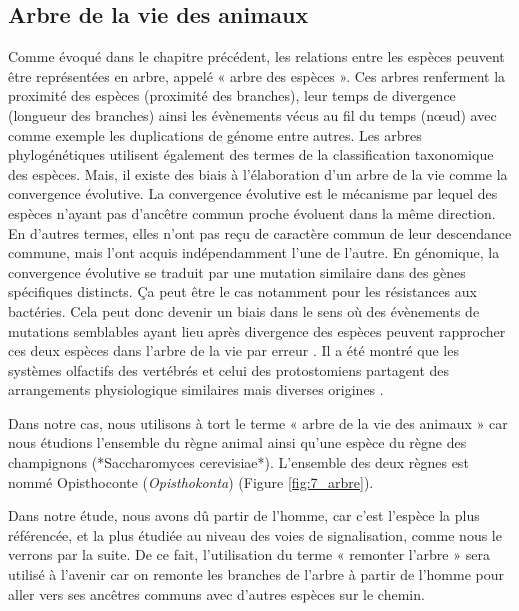 \subsection{Arbre de la vie des animaux}\label{tree}
\par Comme évoqué dans le chapitre précédent, les relations entre les espèces peuvent être représentées en arbre, appelé « arbre des espèces ». Ces arbres renferment la proximité des espèces (proximité des branches), leur temps de divergence (longueur des branches) ainsi les évènements vécus au fil du temps (nœud) avec comme exemple les duplications de génome entre autres. Les arbres phylogénétiques utilisent également des termes de la classification taxonomique des espèces. 
Mais, il existe des biais à l’élaboration d’un arbre de la vie comme la convergence évolutive. La convergence évolutive est le mécanisme par lequel des espèces n’ayant pas d’ancêtre commun proche évoluent dans la même direction. En d’autres termes, elles n’ont pas reçu de caractère commun de leur descendance commune, mais l’ont acquis indépendamment l’une de l’autre. En génomique, la convergence évolutive se traduit par une mutation similaire dans des gènes spécifiques distincts. Ça peut être le cas notamment pour les résistances aux bactéries. Cela peut donc devenir un biais dans le sens où des évènements de mutations semblables ayant lieu après divergence des espèces peuvent rapprocher ces deux espèces dans l’arbre de la vie par erreur \parencite{christin_causes_2010}. Il a été montré que les systèmes olfactifs des vertébrés et celui des protostomiens partagent des arrangements physiologique similaires \parencite{hildebrand_mechanisms_1997} mais diverses origines \parencite{strausfeld_olfactory_1999}.
\par Dans notre cas, nous utilisons à tort le terme « arbre de la vie des animaux » car nous étudions l’ensemble du règne animal ainsi qu’une espèce du règne des champignons (*Saccharomyces cerevisiae*). L’ensemble des deux règnes est nommé Opisthoconte (\textit{Opisthokonta}) (Figure \ref{fig:7_arbre}). 
\par Dans notre étude, nous avons dû partir de l’homme, car c’est l’espèce la plus référencée, et la plus étudiée au niveau des voies de signalisation, comme nous le verrons par la suite. De ce fait, l’utilisation du terme « remonter l’arbre » sera utilisé à l’avenir car on remonte les branches de l’arbre à partir de l’homme pour aller vers ses ancêtres communs avec d’autres espèces sur le chemin. 
